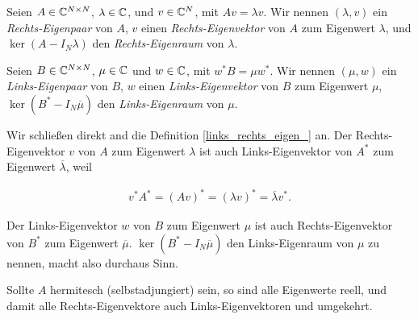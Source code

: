 \begin{definition} \label{links_rechts_eigen_}

    Seien $A \in \mathbb{C}^{N \times N}$, $\lambda \in \mathbb{C}$, und $v \in \mathbb{C}^N$, mit $A v = \lambda v$.
    Wir nennen $(\lambda, v)$ ein \textit{Rechts-Eigenpaar} von $A$, $v$ einen \textit{Rechts-Eigenvektor} von $A$ zum Eigenwert $\lambda$, und $\ker (A - I_N \lambda)$ den \textit{Rechts-Eigenraum} von $\lambda$.

    Seien $B \in \mathbb{C}^{N \times N}$, $\mu \in \mathbb{C}$ und $w \in \mathbb{C}$, mit $w^\ast B = \mu w^\ast$.
    Wir nennen $(\mu, w)$ ein \textit{Links-Eigenpaar} von $B$, $w$ einen \textit{Links-Eigenvektor} von $B$ zum Eigenwert $\mu$, $\ker (B^\ast - I_N \overline \mu)$ den \textit{Links-Eigenraum} von $\mu$.

\end{definition}

\begin{remark}
    
    Wir schließen direkt and die Definition \ref{links_rechts_eigen_} an.
    Der Rechts-Eigenvektor $v$ von $A$ zum Eigenwert $\lambda$ ist auch Links-Eigenvektor von $A^\ast$ zum Eigenwert $\overline \lambda$, weil

    \begin{align*}
        v^\ast A^\ast
        =
        (A v)^\ast
        =
        (\lambda v)^\ast
        =
        \overline \lambda v^\ast.
    \end{align*}

    Der Links-Eigenvektor $w$ von $B$ zum Eigenwert $\mu$ ist auch Rechts-Eigenvektor von $B^\ast$ zum Eigenwert $\overline \mu$.
    $\ker (B^\ast - I_N \overline \mu)$ den Links-Eigenraum von $\mu$ zu nennen, macht also durchaus Sinn.

    Sollte $A$ hermitesch (selbstadjungiert) sein, so sind alle Eigenwerte reell, und damit alle Rechts-Eigenvektore auch Links-Eigenvektoren und umgekehrt.

\end{remark}

\begin{comment}



    $A^\ast$ ist tatsächlich die Adjungierte von $A$ im Sinne der Funktionalanalysis, weil $\Forall x, y \in \C^N:$

    \begin{align*}
        (A x, y)_2
        =
        y^\ast A x
        =
        (A^\ast y)^\ast x
        =
        (x, A^\ast y)_2.
    \end{align*}

    Nun ist $\overline \lambda$ Eigenwert von $A^\ast$ mit derselben algebraischen Vielfachheit wie $\lambda$, weil

    \begin{align*}
        \chi_{A^\ast}(\lambda)
        =
        \det(A^\ast - I_N \lambda)
        =
        \overline{\det(A - I_N \lambda)^\top}
        =
        \overline{\chi_A(\lambda)}.
    \end{align*}

\end{comment}